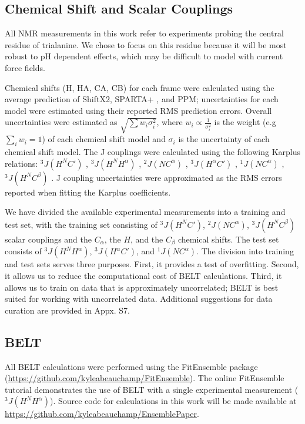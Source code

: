 \documentclass[11pt,titlepage]{article}
\begin{document}
\subsection*{Chemical Shift and Scalar Couplings}

All NMR measurements in this work refer to experiments \citep{Graf2007} probing the central residue of trialanine.  We chose to focus on this residue because it will be most robust to pH dependent effects, which may be difficult to model with current force fields.  

Chemical shifts (H, HA, CA, CB) for each frame were calculated using the average prediction of ShiftX2\citep{han2011shiftx2}, SPARTA+ \citep{Shen2010}, and PPM\citep{li2012ppm}; uncertainties for each model were estimated using their reported RMS prediction errors.  Overall uncertainties were estimated as $\sqrt{\sum w_i \sigma_i^2}$, where $w_i \propto \frac{1}{\sigma_i^2}$ is the weight (e.g $\sum_i w_i = 1$) of each chemical shift model and $\sigma_i$ is the uncertainty of each chemical shift model.  The J couplings were calculated using the following Karplus relations: $^3J(H^N C')$ \citep{Schmidt1999}, $^3J(H^N H^\alpha)$ \citep{vogeli2007limits}, $^2J(N C^\alpha)$ \citep{Graf2007}, $^3J(H^\alpha C')$ \citep{Schmidt1999}, $^1J(N C^\alpha)$ \citep{Graf2007}, $^3J(H^N C^\beta)$ \citep{vogeli2007limits}.  J coupling uncertainties were approximated as the RMS errors reported when fitting the Karplus coefficients.  

We have divided the available experimental measurements into a training and test set, with the training set consisting of $^3J(H^N C')$,  $^2J(N C^\alpha)$, $^3J(H^N C^\beta)$ scalar couplings and the $C_\alpha$, the $H$, and the $C_\beta$ chemical shifts.  The test set consists of $^3J(H^N H^\alpha)$, $^3J(H^\alpha C')$, and $^1J(N C^\alpha)$.  The division into training and test sets serves three purposes.  First, it provides a test of overfitting.  Second, it allows us to reduce the computational cost of BELT calculations.  Third, it allows us to train on data that is approximately uncorrelated; BELT is best suited for working with uncorrelated data.  Additional suggestions for data curation are provided in Appx. S7.  

\subsection*{BELT}

All BELT calculations were performed using the FitEnsemble package (\url{https://github.com/kyleabeauchamp/FitEnsemble}).  The online FitEnsemble tutorial demonstrates the use of BELT with a single experimental measurement ($^3J(H^N H^\alpha)$).  Source code for calculations in this work will be made available at \url{https://github.com/kyleabeauchamp/EnsemblePaper}.  
\end{document}
